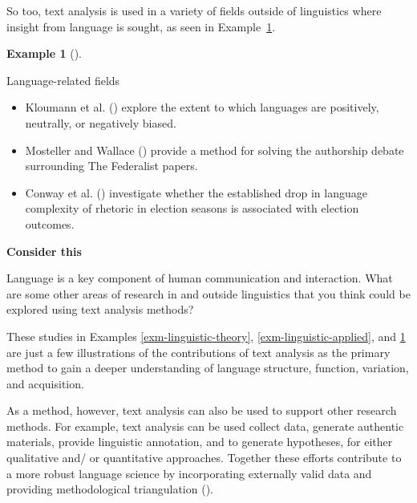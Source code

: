 \documentclass[
  letterpaper,
]{latex/krantz}
\providecommand{\tightlist}{%
  \setlength{\itemsep}{0pt}\setlength{\parskip}{0pt}}\usepackage{longtable,booktabs,array}
\theoremstyle{definition}
\newtheorem{example}{Example}[chapter]
\theoremstyle{remark}
\begin{document}
So too, text analysis is used in a variety of fields outside of
linguistics where insight from language is sought, as seen in
Example~\ref{exm-other-fields}.

\begin{example}[]\protect\hypertarget{exm-other-fields}{}\label{exm-other-fields}

Language-related fields

\begin{itemize}
\tightlist
\item
  Kloumann et al. () explore the extent
  to which languages are positively, neutrally, or negatively biased.
\item
  Mosteller and Wallace () provide a
  method for solving the authorship debate surrounding The Federalist
  papers.
\item
  Conway et al. () investigate whether
  the established drop in language complexity of rhetoric in election
  seasons is associated with election outcomes.
\end{itemize}

\end{example}

\begin{tcolorbox}[enhanced jigsaw, colframe=quarto-callout-color-frame, breakable, bottomrule=.15mm, arc=.35mm, left=2mm, opacityback=0, rightrule=.15mm, colback=white, toprule=.15mm, leftrule=.75mm]

\textbf{ Consider this}

Language is a key component of human communication and interaction. What
are some other areas of research in and outside linguistics that you
think could be explored using text analysis methods?

\end{tcolorbox}

These studies in Examples \ref{exm-linguistic-theory},
\ref{exm-linguistic-applied}, and \ref{exm-other-fields} are just a few
illustrations of the contributions of text analysis as the primary
method to gain a deeper understanding of language structure, function,
variation, and acquisition.

As a method, however, text analysis can also be used to support other
research methods. For example, text analysis can be used collect data,
generate authentic materials, provide linguistic annotation, and to
generate hypotheses, for either qualitative and/ or quantitative
approaches. Together these efforts contribute to a more robust language
science by incorporating externally valid data and providing
methodological triangulation ().
\end{document}
